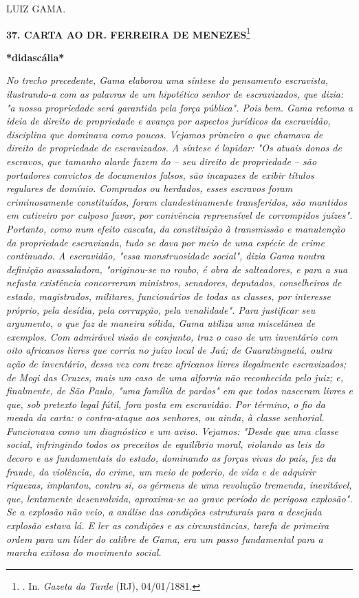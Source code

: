 LUIZ GAMA.

\textbf{37. CARTA AO DR. FERREIRA DE MENEZES}\footnote{. In.
  \emph{Gazeta da Tarde} (RJ), 04/01/1881.}

\textbf{*didascália*}

\emph{No trecho precedente, Gama elaborou uma síntese do pensamento
escravista, ilustrando-a com as palavras de um hipotético senhor de
escravizados, que dizia: "a nossa propriedade será garantida pela força
pública". Pois bem. Gama retoma a ideia de direito de propriedade e
avança por aspectos jurídicos da escravidão, disciplina que dominava
como poucos. Vejamos primeiro o que chamava de direito de propriedade de
escravizados. A síntese é lapidar: "Os atuais donos de escravos, que
tamanho alarde fazem do -- seu direito de propriedade -- são portadores
convictos de documentos falsos, são incapazes de exibir títulos
regulares de domínio. Comprados ou herdados, esses escravos foram
criminosamente constituídos, foram clandestinamente transferidos, são
mantidos em cativeiro por culposo favor, por conivência repreensível de
corrompidos juízes". Portanto, como num efeito cascata, da constituição
à transmissão e manutenção da propriedade escravizada, tudo se dava por
meio de uma espécie de crime continuado. A escravidão, "essa
monstruosidade social", dizia Gama noutra definição avassaladora,
"originou-se no roubo, é obra de salteadores, e para a sua nefasta
existência concorreram ministros, senadores, deputados, conselheiros de
estado, magistrados, militares, funcionários de todas as classes, por
interesse próprio, pela desídia, pela corrupção, pela venalidade". Para
justificar seu argumento, o que faz de maneira sólida, Gama utiliza uma
miscelânea de exemplos. Com admirável visão de conjunto, traz o caso de
um inventário com oito africanos livres que corria no juízo local de
Jaú; de Guaratinguetá, outra ação de inventário, dessa vez com treze
africanos livres ilegalmente escravizados; de Mogi das Cruzes, mais um
caso de uma alforria não reconhecida pelo juiz; e, finalmente, de São
Paulo, "uma família de pardos" em que todos nasceram livres e que, sob
pretexto legal fútil, fora posta em escravidão. Por término, o fio da
meada da carta: o contra-ataque aos senhores, ou ainda, à classe
senhorial. Funcionava como um diagnóstico e um aviso. Vejamos: "Desde
que uma classe social, infringindo todos os preceitos de equilíbrio
moral, violando as leis do decoro e as fundamentais do estado, dominando
as forças vivas do país, fez da fraude, da violência, do crime, um meio
de poderio, de vida e de adquirir riquezas, implantou, contra si, os
gérmens de uma revolução tremenda, inevitável, que, lentamente
desenvolvida, aproxima-se ao grave período de perigosa explosão". Se a
explosão não veio, a análise das condições estruturais para a desejada
explosão estava lá. E ler as condições e as circunstâncias, tarefa de
primeira ordem para um líder do calibre de Gama, era um passo
fundamental para a marcha exitosa do movimento social.}

